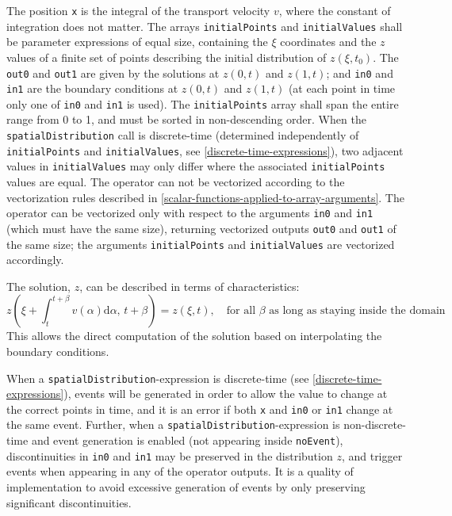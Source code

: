 The position \lstinline!x! is the integral of the transport velocity $v$, where the constant of integration does not matter.
The arrays \lstinline!initialPoints! and \lstinline!initialValues! shall be parameter expressions of equal size, containing the $\xi$ coordinates and the $z$ values of a finite set of points describing the initial distribution of $z(\xi, t_{0})$.
The \lstinline!out0! and \lstinline!out1! are given by the solutions at $z(0, t)$ and $z(1, t)$; and \lstinline!in0! and \lstinline!in1! are the boundary conditions at $z(0, t)$ and $z(1, t)$ (at each point in time only one of \lstinline!in0! and \lstinline!in1! is used).
The \lstinline!initialPoints! array shall span the entire range from 0 to 1, and must be sorted in non-descending order.
When the \lstinline!spatialDistribution! call is discrete-time (determined independently of \lstinline!initialPoints! and \lstinline!initialValues!, see \cref{discrete-time-expressions}), two adjacent values in \lstinline!initialValues! may only differ where the associated \lstinline!initialPoints! values are equal.
The operator can not be vectorized according to the vectorization rules described in \cref{scalar-functions-applied-to-array-arguments}.
The operator can be vectorized only with respect to the arguments \lstinline!in0! and \lstinline!in1! (which must have the same size), returning vectorized outputs \lstinline!out0! and \lstinline!out1! of the same size; the arguments \lstinline!initialPoints! and \lstinline!initialValues! are vectorized accordingly.

The solution, $z$, can be described in terms of characteristics:
\begin{equation*}
z(\xi+\int_{t}^{t+\beta}\! v(\alpha) \mathrm{d}\alpha,\, t+\beta) = z(\xi, t), \quad\text{for all $\beta$ as long as staying inside the domain}
\end{equation*}
This allows the direct computation of the solution based on interpolating the boundary conditions.

When a \lstinline!spatialDistribution!-expression is discrete-time (see \cref{discrete-time-expressions}), events will be generated in order to allow the value to change at the correct points in time, and it is an error if both \lstinline!x! and \lstinline!in0! or \lstinline!in1! change at the same event.
Further, when a \lstinline!spatialDistribution!-expression is non-discrete-time and event generation is enabled (not appearing inside \lstinline!noEvent!), discontinuities in \lstinline!in0! and \lstinline!in1! may be preserved in the distribution $z$, and trigger events when appearing in any of the operator outputs.
It is a quality of implementation to avoid excessive generation of events by only preserving significant discontinuities.

